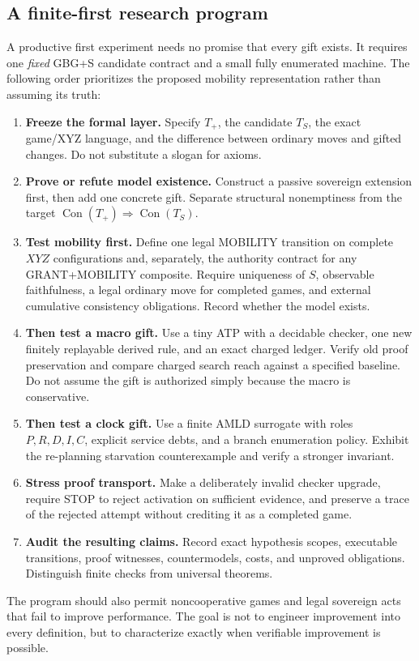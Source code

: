 \documentclass[11pt,letterpaper]{article}
\theoremstyle{definition}\newtheorem{definition}[theorem]{Definition}\newtheorem{example}[theorem]{Example}
\theoremstyle{remark}\newtheorem{remark}[theorem]{Remark}
\newcommand{\Con}{\operatorname{Con}}
\begin{document}
\subsection{A finite-first research program}
A productive first experiment needs no promise that every gift exists. It requires one \emph{fixed} GBG+S candidate contract and a small fully enumerated machine. The following order prioritizes the proposed mobility representation rather than assuming its truth:
\begin{enumerate}
\item \textbf{Freeze the formal layer.} Specify $T_+$, the candidate $T_S$, the exact game/XYZ language, and the difference between ordinary moves and gifted changes. Do not substitute a slogan for axioms.
\item \textbf{Prove or refute model existence.} Construct a passive sovereign extension first, then add one concrete gift. Separate structural nonemptiness from the target $\Con(T_+)\Rightarrow\Con(T_S)$.
\item \textbf{Test mobility first.} Define one legal MOBILITY transition on complete $XYZ$ configurations and, separately, the authority contract for any GRANT+MOBILITY composite. Require uniqueness of $S$, observable faithfulness, a legal ordinary move for completed games, and external cumulative consistency obligations. Record whether the model exists.
\item \textbf{Then test a macro gift.} Use a tiny ATP with a decidable checker, one new finitely replayable derived rule, and an exact charged ledger. Verify old proof preservation and compare charged search reach against a specified baseline. Do not assume the gift is authorized simply because the macro is conservative.
\item \textbf{Then test a clock gift.} Use a finite AMLD surrogate with roles $P,R,D,I,C$, explicit service debts, and a branch enumeration policy. Exhibit the re-planning starvation counterexample and verify a stronger invariant.
\item \textbf{Stress proof transport.} Make a deliberately invalid checker upgrade, require STOP to reject activation on sufficient evidence, and preserve a trace of the rejected attempt without crediting it as a completed game.
\item \textbf{Audit the resulting claims.} Record exact hypothesis scopes, executable transitions, proof witnesses, countermodels, costs, and unproved obligations. Distinguish finite checks from universal theorems.
\end{enumerate}
The program should also permit noncooperative games and legal sovereign acts that fail to improve performance. The goal is not to engineer improvement into every definition, but to characterize exactly when verifiable improvement is possible.
\end{document}
